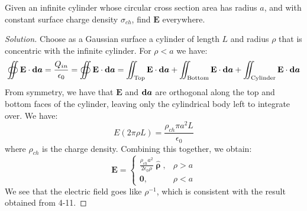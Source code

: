             \begin{problem}[Wangsness 4-7]
                Given an infinite cylinder whose circular
                cross section area has radius $a$, and with
                constant surface charge density $\sigma_{ch}$,
                find $\mathbf{E}$ everywhere.
            \end{problem}
            \begin{proof}[Solution]
                Choose as a Gaussian surface a cylinder of length
                $L$ and radius $\rho$ that is concentric with the
                infinite cylinder. For $\rho<a$ we have:
                \begin{equation*}
                    \oiint\mathbf{E}\cdot\boldsymbol{\mathop{}\!\mathrm{d}{a}}
                    =\frac{Q_{in}}{\epsilon_{0}}
                    =\oiint\mathbf{E}\cdot\boldsymbol{\mathop{}\!\mathrm{d}{a}}
                    =\iint_{\textrm{Top}}
                    \mathbf{E}\cdot\boldsymbol{\mathop{}\!\mathrm{d}{a}}
                    +\iint_{\textrm{Bottom}}
                    \mathbf{E}\cdot\boldsymbol{\mathop{}\!\mathrm{d}{a}}
                    +\iint_{\textrm{Cylinder}}
                    \mathbf{E}\cdot\boldsymbol{\mathop{}\!\mathrm{d}{a}}
                \end{equation*}
                From symmetry, we have that $\mathbf{E}$ and
                $\boldsymbol{\mathop{}\!\mathrm{d}{a}}$ are orthogonal along the
                top and bottom faces of the cylinder, leaving only
                the cylindrical body left to integrate over. We have:
                \begin{equation*}
                    E(2\pi\rho{L})
                    =\frac{\rho_{ch}\pi{a}^{2}L}{\epsilon_{0}}
                \end{equation*}
                where $\rho_{ch}$ is the charge density.
                Combining this together, we obtain:
                \begin{equation*}
                    \mathbf{E}=
                    \begin{cases}
                        \frac{\rho_{ch}a^{2}}{2\epsilon_{0}\rho}
                        \hat{\boldsymbol{\uprho}},
                        &\rho>a\\
                        \mathbf{0},&\rho<a
                    \end{cases}
                \end{equation*}
                We see that the electric field goes like $\rho^{-1}$,
                which is consistent with the result obtained from 4-11.
            \end{proof}
